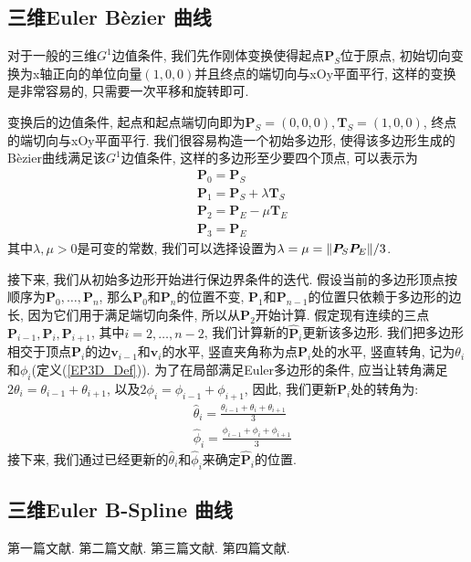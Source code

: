 \documentclass[utf8]{ctexart} %
\begin{document}
	 \subsection{三维Euler B\`{e}zier 曲线}
	 对于一般的三维$G^1$边值条件, 我们先作刚体变换使得起点$\boldsymbol{P}_S$位于原点, 初始切向变换为x轴正向的单位向量$(1,0,0)$并且终点的端切向与xOy平面平行, 这样的变换是非常容易的, 只需要一次平移和旋转即可. \par
	 变换后的边值条件, 起点和起点端切向即为$\boldsymbol{P}_S=(0,0,0), \boldsymbol{T}_S = (1,0,0)$, 终点的端切向与xOy平面平行. 我们很容易构造一个初始多边形, 使得该多边形生成的B\`ezier曲线满足该$G^1$边值条件, 这样的多边形至少要四个顶点, 可以表示为
	 \begin{equation}
	 	\begin{aligned}
	 		&\boldsymbol{P}_0 = \boldsymbol{P}_S\\
	 		&\boldsymbol{P}_1 = \boldsymbol{P}_S+\lambda\boldsymbol{T}_S\\
	 		&\boldsymbol{P}_2 = \boldsymbol{P}_E-\mu\boldsymbol{T}_E\\
	 		&\boldsymbol{P}_3 = \boldsymbol{P}_E
	 	\end{aligned}
	 \end{equation}
	 其中$\lambda, \mu>0$是可变的常数, 我们可以选择设置为$\lambda = \mu = \Arrowvert\boldsymbol{P}_S\boldsymbol{P}_E\Arrowvert/3$. \par 
	 接下来, 我们从初始多边形开始进行保边界条件的迭代. 假设当前的多边形顶点按顺序为$\boldsymbol{P}_0, \dots,\boldsymbol{P}_n$, 那么$\boldsymbol{P}_0$和$\boldsymbol{P}_n$的位置不变, $\boldsymbol{P}_1$和$\boldsymbol{P}_{n-1}$的位置只依赖于多边形的边长, 因为它们用于满足端切向条件, 所以从$\boldsymbol{P}_2$开始计算. 假定现有连续的三点$\boldsymbol{P}_{i-1},\boldsymbol{P}_i,\boldsymbol{P}_{i+1}$, 其中$i=2,\dots,n-2$, 我们计算新的$\hat{\boldsymbol{P}}_i$更新该多边形. 我们把多边形相交于顶点$\boldsymbol{P}_i$的边$\boldsymbol{v}_{i-1}$和$\boldsymbol{v}_{i}$的水平, 竖直夹角称为点$\boldsymbol{P}_i$处的水平, 竖直转角, 记为$\theta_i$和$\phi_i$(定义(\ref{EP3D_Def})). 为了在局部满足Euler多边形的条件, 应当让转角满足$2\theta_i = \theta_{i-1}+\theta_{i+1}$, 以及$2\phi_{i} = \phi_{i-1}+\phi_{i+1}$, 因此, 我们更新$\boldsymbol{P}_i$处的转角为:
	 \begin{equation}
	 	\begin{aligned}
	 		&\hat{\theta}_i = \frac{\theta_{i-1}+\theta_i+\theta_{i+1}}3\\
	 		&\hat{\phi}_i =
	 		\frac{\phi_{i-1}+\phi_i+\phi_{i+1}}3
	 	\end{aligned}
	 \end{equation}
	 接下来, 我们通过已经更新的$\hat{\theta}_i$和$\hat{\phi}_i$来确定$\hat{\boldsymbol{P}}_i$的位置. 
	 \subsection{三维Euler B-Spline 曲线}
		
		
		\renewcommand\refname{参考文献}
		\begin{thebibliography}{100}%
				第一篇文献.
				第二篇文献.
				第三篇文献.
				第四篇文献.
		\end{thebibliography}  
\end{document}
